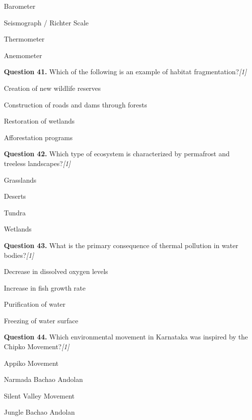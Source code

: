 \documentclass[11pt,a4paper]{article}
\newcommand{\pts}[1]{\hfill   \textit{[#1]}}
\begin{document}
\begin{parts}
  \item Barometer
  \item Seismograph / Richter Scale
  \item Thermometer
  \item Anemometer
\end{parts}

\medskip


\noindent   \textbf{Question 41.} Which of the following is an example of habitat fragmentation?\pts{1}

\begin{parts}
  \item Creation of new wildlife reserves
  \item Construction of roads and dams through forests
  \item Restoration of wetlands
  \item Afforestation programs
\end{parts}

\medskip


\noindent   \textbf{Question 42.} Which type of ecosystem is characterized by permafrost and treeless landscapes?\pts{1}

\begin{parts}
  \item Grasslands
  \item Deserts
  \item Tundra
  \item Wetlands
\end{parts}

\medskip


\noindent   \textbf{Question 43.} What is the primary consequence of thermal pollution in water bodies?\pts{1}

\begin{parts}
  \item Decrease in dissolved oxygen levels
  \item Increase in fish growth rate
  \item Purification of water
  \item Freezing of water surface
\end{parts}

\medskip


\noindent   \textbf{Question 44.} Which environmental movement in Karnataka was inspired by the Chipko Movement?\pts{1}

\begin{parts}
  \item Appiko Movement
  \item Narmada Bachao Andolan
  \item Silent Valley Movement
  \item Jungle Bachao Andolan
\end{parts}
\end{document}
